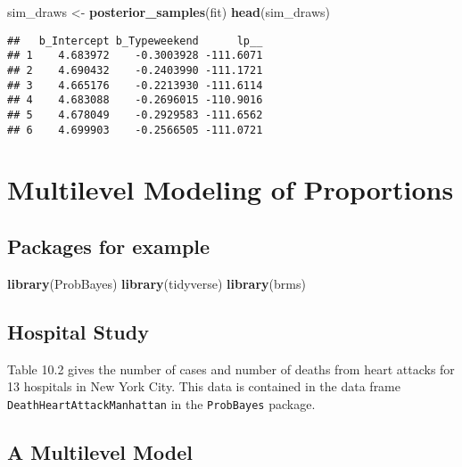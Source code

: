 \documentclass[
]{book}
\newenvironment{Shaded}{\begin{snugshade}}{\end{snugshade}}
\newcommand{\KeywordTok}[1]{\textcolor[rgb]{0.13,0.29,0.53}{\textbf{#1}}}
\newcommand{\NormalTok}[1]{#1}
\newcommand{\StringTok}[1]{\textcolor[rgb]{0.31,0.60,0.02}{#1}}
\begin{document}
\begin{Shaded}
\begin{Highlighting}[]
\NormalTok{sim_draws <-}\StringTok{ }\KeywordTok{posterior_samples}\NormalTok{(fit)}
\KeywordTok{head}\NormalTok{(sim_draws)}
\end{Highlighting}
\end{Shaded}

\begin{verbatim}
##   b_Intercept b_Typeweekend      lp__
## 1    4.683972    -0.3003928 -111.6071
## 2    4.690432    -0.2403990 -111.1721
## 3    4.665176    -0.2213930 -111.6114
## 4    4.683088    -0.2696015 -110.9016
## 5    4.678049    -0.2929583 -111.6562
## 6    4.699903    -0.2566505 -111.0721
\end{verbatim}

\hypertarget{multilevel-modeling-of-proportions}{%
\chapter{Multilevel Modeling of Proportions}\label{multilevel-modeling-of-proportions}}

\hypertarget{packages-for-example}{%
\section{Packages for example}\label{packages-for-example}}

\begin{Shaded}
\begin{Highlighting}[]
\KeywordTok{library}\NormalTok{(ProbBayes)}
\KeywordTok{library}\NormalTok{(tidyverse)}
\KeywordTok{library}\NormalTok{(brms)}
\end{Highlighting}
\end{Shaded}

\hypertarget{hospital-study}{%
\section{Hospital Study}\label{hospital-study}}

Table 10.2 gives the number of cases and number of deaths from heart attacks for 13 hospitals in New York City. This data is contained in the data frame \texttt{DeathHeartAttackManhattan} in the \texttt{ProbBayes} package.

\hypertarget{a-multilevel-model}{%
\section{A Multilevel Model}\label{a-multilevel-model}}
\end{document}
